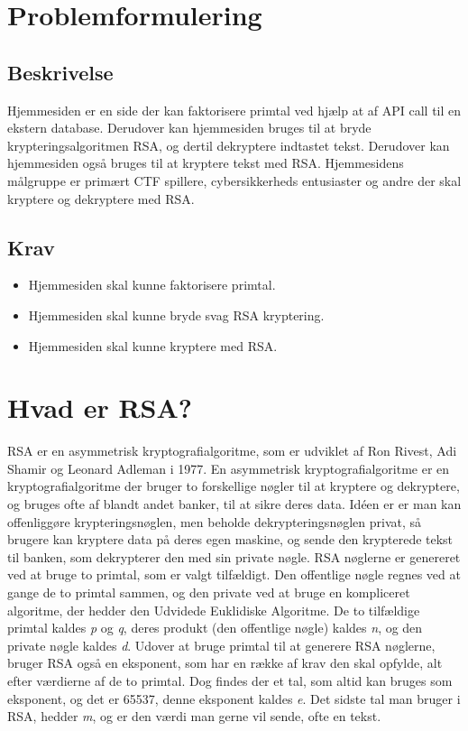 \documentclass[a4paper,12pt]{extarticle}
\begin{document}
    \tableofcontents

    \newpage


    \section{Problemformulering}\label{sec:problemformulering}

    \subsection{Beskrivelse}\label{subsec:beskrivelse}
    Hjemmesiden er en side der kan faktorisere primtal ved hjælp at af API call til en ekstern database.
    Derudover kan hjemmesiden bruges til at bryde krypteringsalgoritmen RSA, og dertil dekryptere indtastet tekst.
    Derudover kan hjemmesiden også bruges til at kryptere tekst med RSA. Hjemmesidens målgruppe er primært CTF
    spillere, cybersikkerheds entusiaster og andre der skal kryptere og dekryptere med RSA\@.

    \subsection{Krav}\label{subsec:krav}
    \begin{itemize}
        \item Hjemmesiden skal kunne faktorisere primtal.
        \item Hjemmesiden skal kunne bryde svag RSA kryptering.
        \item Hjemmesiden skal kunne kryptere med RSA\@.
    \end{itemize}


    \section{Hvad er RSA?}\label{sec:hvad-er-rsa}
    RSA er en asymmetrisk kryptografialgoritme, som er udviklet af Ron Rivest, Adi Shamir og Leonard Adleman i 1977.
    En asymmetrisk kryptografialgoritme er en kryptografialgoritme der bruger to forskellige nøgler til at kryptere og dekryptere,
    og bruges ofte af blandt andet banker, til at sikre deres data.
    Idéen er er man kan offenliggøre krypteringsnøglen, men beholde dekrypteringsnøglen privat, så brugere kan kryptere data på deres egen maskine,
    og sende den krypterede tekst til banken, som dekrypterer den med sin private nøgle.
    RSA nøglerne er genereret ved at bruge to primtal, som er valgt tilfældigt.
    Den offentlige nøgle regnes ved at gange de to primtal sammen, og den private ved at bruge en kompliceret algoritme,
    der hedder den Udvidede Euklidiske Algoritme.\@
    De to tilfældige primtal kaldes \emph{p} og \emph{q}, deres produkt (den offentlige nøgle) kaldes \emph{n}, og den private nøgle kaldes \emph{d}.
    Udover at bruge primtal til at generere RSA nøglerne, bruger RSA også en eksponent, som har en række af krav den skal opfylde,
    alt efter værdierne af de to primtal.
    Dog findes der et tal, som altid kan bruges som eksponent, og det er 65537, denne eksponent kaldes \emph{e}.
    Det sidste tal man bruger i RSA, hedder \emph{m}, og er den værdi man gerne vil sende, ofte en tekst.\@
\end{document}
